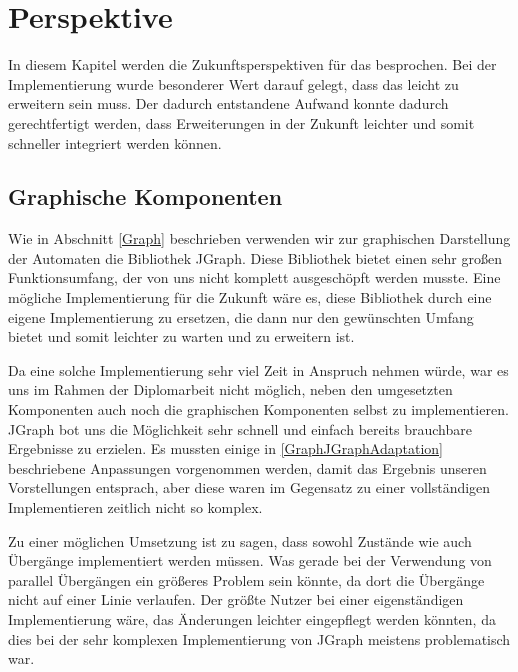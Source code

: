 

\chapter{Perspektive}\label{Perspective}

In diesem Kapitel werden die Zukunftsperspektiven für das \gtitool besprochen.
Bei der Implementierung wurde besonderer Wert darauf gelegt, dass das \gtitool
leicht zu erweitern sein muss. Der dadurch entstandene Aufwand konnte dadurch
gerechtfertigt werden, dass Erweiterungen in der Zukunft leichter und somit
schneller integriert werden können.\vspace{10pt}


\section{Graphische Komponenten}\label{PerspectiveGraphics}

Wie in Abschnitt \ref{Graph} beschrieben verwenden wir zur graphischen
Darstellung der Automaten die Bibliothek JGraph. Diese Bibliothek bietet einen
sehr großen Funktionsumfang, der von uns nicht komplett ausgeschöpft werden
musste. Eine mögliche Implementierung für die Zukunft wäre es, diese Bibliothek
durch eine eigene Implementierung zu ersetzen, die dann nur den gewünschten
Umfang bietet und somit leichter zu warten und zu erweitern ist.\vspace{10pt}

Da eine solche Implementierung sehr viel Zeit in Anspruch nehmen würde, war es
uns im Rahmen der Diplomarbeit nicht möglich, neben den umgesetzten Komponenten
auch noch die graphischen Komponenten selbst zu implementieren. JGraph bot uns
die Möglichkeit sehr schnell und einfach bereits brauchbare Ergebnisse zu
erzielen. Es mussten einige in \ref{GraphJGraphAdaptation} beschriebene
Anpassungen vorgenommen werden, damit das Ergebnis unseren Vorstellungen
entsprach, aber diese waren im Gegensatz zu einer vollständigen Implementieren
zeitlich nicht so komplex.\vspace{10pt}

Zu einer möglichen Umsetzung ist zu sagen, dass sowohl Zustände wie auch
Übergänge implementiert werden müssen. Was gerade bei der Verwendung von parallel
Übergängen ein größeres Problem sein könnte, da dort die Übergänge nicht auf
einer Linie verlaufen. Der größte Nutzer bei einer eigenständigen Implementierung
wäre, das Änderungen leichter eingepflegt werden könnten, da dies bei der sehr
komplexen Implementierung von JGraph meistens problematisch war.\vspace{10pt}


